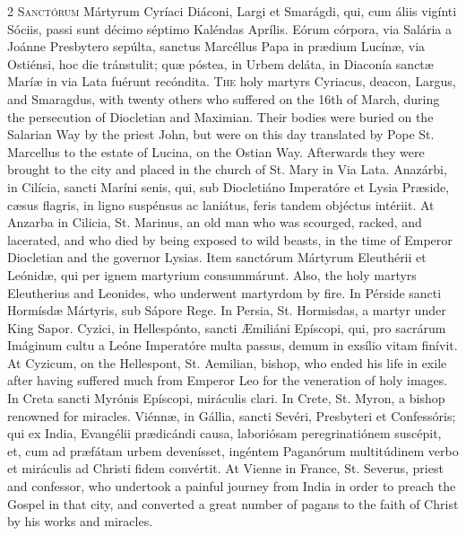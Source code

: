 \begin{paracol}{2}
\lettrine[lines=2]{S}{anctórum} Mártyrum 
 Cyríaci Diáconi, Largi et Smarágdi, qui, cum áliis vigínti Sóciis, passi 
 sunt décimo séptimo Kaléndas Aprílis. Eórum córpora, via Salária a 
 Joánne Presbytero sepúlta, sanctus Marcéllus Papa in prædium Lucínæ, via 
 Ostiénsi, hoc die tránstulit; quæ póstea, in Urbem deláta, in Diaconía 
 sanctæ Maríæ in via Lata fuérunt recóndita.
\switchcolumn
{}
\lettrine[lines=2]{T}{he} holy martyrs Cyriacus, deacon, 
 Largus, and Smaragdus, with twenty others who suffered on the 16th of March, 
 during the persecution of Diocletian and Maximian. Their bodies were 
 buried on the Salarian Way by the priest John, but were on this day 
 translated by Pope St. Marcellus to the estate of Lucina, on the Ostian Way. 
 Afterwards they were brought to the city and placed in the church of St. 
 Mary in Via Lata.
\switchcolumn*
{}
Anazárbi, in Cilícia, sancti Maríni senis, qui, sub Diocletiáno Imperatóre et Lysia Præside, cæsus 
 flagris, in ligno suspénsus ac laniátus, feris tandem objéctus intériit.
\switchcolumn
{}
At Anzarba in Cilicia, St. Marinus, 
 an old man who was scourged, racked, and lacerated, and who died by being 
 exposed to wild beasts, in the time of Emperor Diocletian and the governor 
 Lysias.
\switchcolumn*
{}
Item sanctórum Mártyrum 
 Eleuthérii et Leónidæ, qui per ignem martyrium consummárunt.
\switchcolumn
{}
Also, the holy martyrs Eleutherius 
 and Leonides, who underwent martyrdom by fire.
\switchcolumn*
{}
In Pérside sancti 
 Hormísdæ Mártyris, sub Sápore Rege.
\switchcolumn
{}
In Persia, St. Hormisdas, a martyr 
 under King Sapor.
\switchcolumn*
{}
Cyzici, in Hellespónto, 
 sancti Æmiliáni Epíscopi, qui, pro sacrárum Imáginum cultu a Leóne Imperatóre multa passus, demum in exsílio vitam finívit.
\switchcolumn
{}
At Cyzicum, on the Hellespont, St. 
 Aemilian, bishop, who ended his life in exile after having suffered much 
 from Emperor Leo for the veneration of holy images.
\switchcolumn*
{}
In Creta sancti Myrónis 
 Epíscopi, miráculis clari.
\switchcolumn
{}
In Crete, St. Myron, a bishop 
 renowned for miracles.
\switchcolumn*
{}
Viénnæ, in Gállia, 
 sancti Sevéri, Presbyteri et Confessóris; qui ex India, Evangélii prædicándi 
 causa, laboriósam peregrinatiónem suscépit, et, cum ad præfátam urbem 
 devenísset, ingéntem Paganórum multitúdinem verbo et miráculis ad Christi 
 fidem convértit.
\switchcolumn
{}
At Vienne in France, St. Severus, 
 priest and confessor, who undertook a painful journey from India in order to 
 preach the Gospel in that city, and converted a great number of pagans to 
 the faith of Christ by his works and miracles.
\switchcolumn*
{}
\end{paracol}


